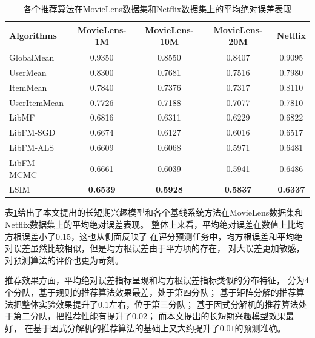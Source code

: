 \begin{table}[htbp]
    \centering
    \caption{各个推荐算法在MovieLens数据集和Netflix数据集上的平均绝对误差表现}
    \label{tab:mae}
    \begin{tabular}{|l|c|c|c|c|}
        \hline
        \textbf{Algorithms} & \textbf{MovieLens-1M} & \textbf{MovieLens-10M} & \textbf{MovieLens-20M} & \textbf{Netflix} \\
        \hline
        GlobalMean   & 0.9350          & 0.8550          & 0.8407          & 0.9095          \\
        UserMean     & 0.8300          & 0.7681          & 0.7516          & 0.7980          \\
        ItemMean     & 0.7840          & 0.7376          & 0.7317          & 0.8110          \\
        UserItemMean & 0.7726          & 0.7188          & 0.7077          & 0.7810          \\
        \hline
        LibMF        & 0.6816          & 0.6311          & 0.6229          & 0.6822          \\
        \hline
        LibFM-SGD    & 0.6674          & 0.6127          & 0.6016          & 0.6517          \\
        LibFM-ALS    & 0.6609          & 0.6068          & 0.5971          & 0.6481          \\
        LibFM-MCMC   & 0.6661          & 0.6039          & 0.5941          & 0.6486          \\
        \hline
        LSIM         & \textbf{0.6539} & \textbf{0.5928} & \textbf{0.5837} & \textbf{0.6337} \\
        \hline
    \end{tabular}
\end{table}

表\ref{tab:mae}给出了本文提出的长短期兴趣模型和各个基线系统方法在MovieLens数据集和Netflix数据集上的平均绝对误差表现。
整体上来看，平均绝对误差在数值上比均方根误差小了$0.15$，这也从侧面反映了
在评分预测任务中，均方根误差和平均绝对误差虽然比较相似，但是均方根误差由于平方项的存在，
对大误差更加敏感，对预测算法的评价也更为苛刻。

推荐效果方面，平均绝对误差指标呈现和均方根误差指标类似的分布特征，
分为4个分队，基于规则的推荐算法效果最差，处于第四分队；
基于矩阵分解的推荐算法把整体实验效果提升了$0.1$左右，位于第三分队；
基于因式分解机的推荐算法处于第二分队，把推荐性能有提升了$0.02$；
而本文提出的长短期兴趣模型效果最好，
在基于因式分解机的推荐算法的基础上又大约提升了$0.01$的预测准确。

